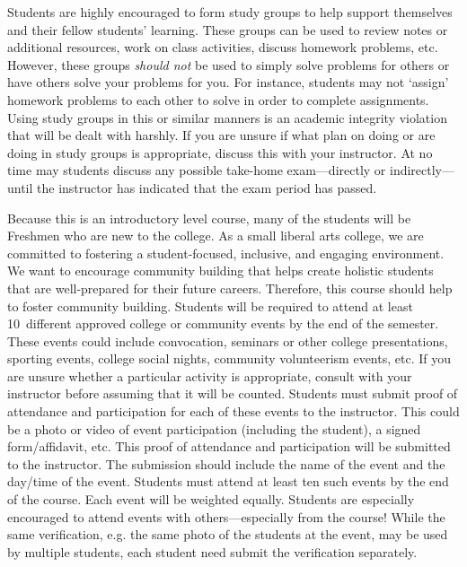 \documentclass[11pt,letterpaper]{article}
\begin{document}
Students are highly encouraged to form study groups to help support themselves and their fellow students' learning. These groups can be used to review notes or additional resources, work on class activities, discuss homework problems, etc. However, these groups {\itshape should not} be used to simply solve problems for others or have others solve your problems for you. For instance, students may not `assign' homework problems to each other to solve in order to complete assignments. Using study groups in this or similar manners is an academic integrity violation that will be dealt with harshly. If you are unsure if what plan on doing or are doing in study groups is appropriate, discuss this with your instructor. At no time may students discuss any possible take-home exam---directly or indirectly---until the instructor has indicated that the exam period has passed. \sectionbreak



 Because this is an introductory level course, many of the students will be Freshmen who are new to the college. As a small liberal arts college, we are committed to fostering a student-focused, inclusive, and engaging environment. We want to encourage community building that helps create holistic students that are well-prepared for their future careers. Therefore, this course should help to foster community building. Students will be required to attend at least 10~different approved college or community events by the end of the semester. These events could include convocation, seminars or other college presentations, sporting events, college social nights, community volunteerism events, etc. If you are unsure whether a particular activity is appropriate, consult with your instructor before assuming that it will be counted. Students must submit proof of attendance and participation for each of these events to the instructor. This could be a photo or video of event participation (including the student), a signed form/affidavit, etc. This proof of attendance and participation will be submitted to the instructor. The submission should include the name of the event and the day/time of the event. Students must attend at least ten such events by the end of the course. Each event will be weighted equally. Students are especially encouraged to attend events with others---especially from the course! While the same verification, e.g. the same photo of the students at the event, may be used by multiple students, each student need submit the verification separately. \pspace
\end{document}
